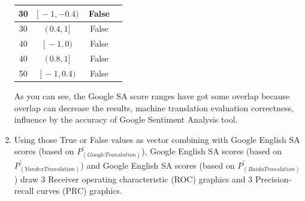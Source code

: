 \documentclass[conference]{IEEEtran}
\begin{document}
\begin{CJK*}{UTF8}{gbsn}
\begin{enumerate}
\begin{table}[h!]
\begin{center}
\begin{tabular}{|c|c|c|c|}
        \hline
        30 & $[ \, -1, -0.4) \,$ & False \\
        \hline
        30 & $( \, 0.4, 1] \,$ & False \\
        \hline
        40 & $[ \, -1, 0) \,$ & False \\
        \hline
        40 & $( \, 0.8, 1] \,$ & False \\
        \hline
        50 & $[ \, -1, 0.4) \,$ & False \\
        \hline
        \hline
      \end{tabular}
    \end{center}
  \end{table}

    As you can see, the Google SA score ranges have got some overlap because
    overlap can decrease the results, machine translation evaluation
    correctness, influence by the accuracy of Google Sentiment Analysis tool.
  \item Using those True or False values as vector combining with Google English
    SA scores (based on $P^{\prime}_{(Google Translation)}$), Google English SA
    scores (based on $ P^{\prime}_{(Yandex Translation)}$) and Google English SA
    scores (based on $P^{\prime}_{(Baidu Translation)}$) draw 3 Receiver operating
    characteristic (ROC) graphics and 3 Precision-recall curves (PRC) graphics.


\end{enumerate}
\end{CJK*}
\end{document}
